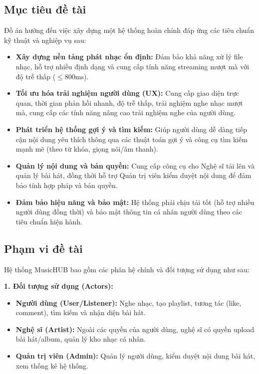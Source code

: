 \documentclass[a4paper]{article}
\newcommand{\cach}{\hspace*{1.5em}\ignorespaces}
\begin{document}
\subsection{Mục tiêu đề tài}
\cach Đồ án hướng đến việc xây dựng một hệ thống hoàn chỉnh đáp ứng các tiêu chuẩn kỹ thuật và nghiệp vụ sau:
\begin{itemize}
    \item \textbf{Xây dựng nền tảng phát nhạc ổn định:} Đảm bảo khả năng xử lý file nhạc, hỗ trợ nhiều định dạng và cung cấp tính năng streaming mượt mà với độ trễ thấp ($\leq 800$ms).
    \item \textbf{Tối ưu hóa trải nghiệm người dùng (UX):} Cung cấp giao diện trực quan, thời gian phản hồi nhanh, độ trễ thấp, trải nghiệm nghe nhạc mượt mà, cung cấp các tính năng nâng cao trải nghiệm nghe của người dùng. 
    \item \textbf{Phát triển hệ thống gợi ý và tìm kiếm:} Giúp người dùng dễ dàng tiếp cận nội dung yêu thích thông qua các thuật toán gợi ý và công cụ tìm kiếm mạnh mẽ (theo từ khóa, giọng nói/âm thanh).
    \item \textbf{Quản lý nội dung và bản quyền:} Cung cấp công cụ cho Nghệ sĩ tải lên và quản lý bài hát, đồng thời hỗ trợ Quản trị viên kiểm duyệt nội dung để đảm bảo tính hợp pháp và bản quyền.
    \item \textbf{Đảm bảo hiệu năng và bảo mật:} Hệ thống phải chịu tải tốt (hỗ trợ nhiều người dùng đồng thời) và bảo mật thông tin cá nhân người dùng theo các tiêu chuẩn hiện hành.
\end{itemize}
\subsection{Phạm vi đề tài}
\cach Hệ thống MusicHUB bao gồm các phân hệ chính và đối tượng sử dụng như sau:

\vspace{0.5em}
\textbf{1. Đối tượng sử dụng (Actors):}
\begin{itemize}
    \item \textbf{Người dùng (User/Listener):} Nghe nhạc, tạo playlist, tương tác (like, comment), tìm kiếm và nhận diện bài hát.
    \item \textbf{Nghệ sĩ (Artist):} Ngoài các quyền của người dùng, nghệ sĩ có quyền upload bài hát/album, quản lý kho nhạc cá nhân.
    \item \textbf{Quản trị viên (Admin):} Quản lý người dùng, kiểm duyệt nội dung bài hát, xem thống kê hệ thống.
\end{itemize}
\end{document}

